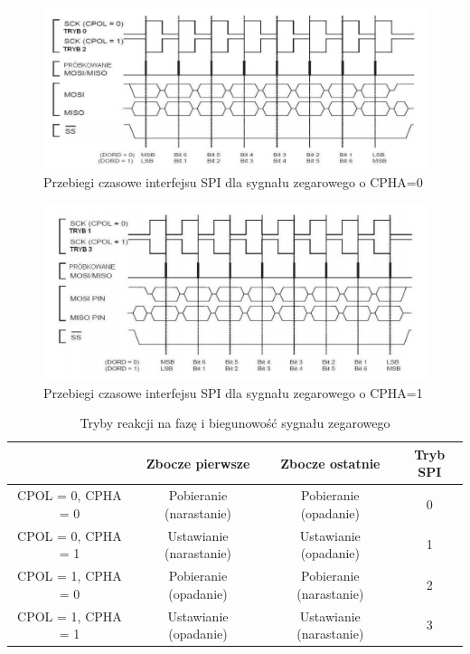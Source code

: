 \documentclass{xmgr}
\begin{document}
\begin{figure}[!h]
    \centering
    \includegraphics[height=0.3\textheight]{images/spi.png}
    \caption{Przebiegi czasowe interfejsu SPI dla sygnału zegarowego o CPHA=0}
\end{figure}

\begin{figure}[!h]
    \centering
    \includegraphics[height=0.3\textheight]{images/spi2.png}
    \caption{Przebiegi czasowe interfejsu SPI dla sygnału zegarowego o CPHA=1}
\end{figure}


\begin{table}[!h]
\begin{tabular}{|c|c|c|c|} \hline
 & Zbocze pierwsze & Zbocze ostatnie & Tryb SPI \\ \hline
CPOL = 0, CPHA = 0 & Pobieranie (narastanie) & Pobieranie (opadanie) & 0 \\ \hline
CPOL = 0, CPHA = 1 & Ustawianie (narastanie) & Ustawianie (opadanie) & 1 \\ \hline
CPOL = 1, CPHA = 0 & Pobieranie	(opadanie) & Pobieranie (narastanie) & 2\\ \hline
CPOL = 1, CPHA = 1 & Ustawianie (opadanie) & Ustawianie (narastanie) & 3 \\ \hline
\end{tabular}
\caption{Tryby reakcji na fazę i biegunowość sygnału zegarowego}
\end{table}
\end{document}
